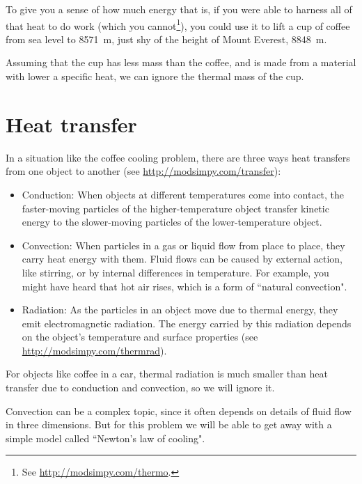 \documentclass[12pt]{book}
\theoremstyle{exercise}
\begin{document}
To give you a sense of how much energy that is, if you were able to harness all of that heat to do work (which you cannot\footnote{See \url{http://modsimpy.com/thermo}.}), you could use it to lift a cup of coffee from sea level to \SI{8571}{\meter}, just shy of the height of Mount Everest, \SI{8848}{\meter}.

Assuming that the cup has less mass than the coffee, and is made from a material with lower a specific heat, we can ignore the thermal mass of the cup.


\section{Heat transfer}

In a situation like the coffee cooling problem, there are three ways heat transfers from one object to another (see \url{http://modsimpy.com/transfer}):

\begin{itemize}

\item Conduction: When objects at different temperatures come into contact, the faster-moving particles of the higher-temperature object transfer kinetic energy to the slower-moving particles of the lower-temperature object.

\item Convection: When particles in a gas or liquid flow from place to place, they carry heat energy with them.  Fluid flows can be caused by external action, like stirring, or by internal differences in temperature.  For example, you might have heard that hot air rises, which is a form of ``natural convection".

\item Radiation: As the particles in an object move due to thermal energy, they emit electromagnetic radiation.  The energy carried by this radiation depends on the object's temperature and surface properties (see \url{http://modsimpy.com/thermrad}).

\end{itemize}

For objects like coffee in a car, thermal radiation is much smaller than 
heat transfer due to conduction and convection, so we will ignore it.

Convection can be a complex topic, since it often depends on details of fluid flow in three dimensions.  But for this problem we will be able to get away with a simple model called ``Newton's law of cooling".
\end{document}
